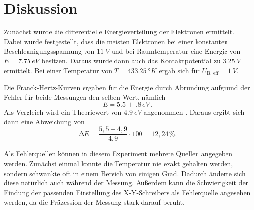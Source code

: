 \section{Diskussion}
\label{sec:Diskussion}

Zunächst wurde die differentielle Energieverteilung der Elektronen ermittelt.
Dabei wurde festgestellt, dass die meisten Elektronen bei einer konstanten Beschleunigungsspannung von $\qty{11}{V}$ und bei Raumtemperatur eine Energie von $E = \qty{7.75}{eV}$ besitzen.
Daraus wurde dann auch das Kontaktpotential zu $\qty{3.25}{V}$ ermittelt.
Bei einer Temperatur von $T = \qty{433.25}{°K}$ ergab sich für $U_\text{B, eff} = \qty{1}{V}$.

Die Franck-Hertz-Kurven ergaben für die Energie durch Abrundung aufgrund der Fehler für beide Messungen den selben Wert,
nämlich
\begin{equation}
    E = \qty{5.5(8)}{eV} \, .
\end{equation}
Als Vergleich wird ein Theoriewert von $\qty{4.9}{eV}$ angenommen \cite{Franck_Hertz}.
Daraus ergibt sich dann eine Abweichung von 
\begin{equation}
    \increment E = \frac{5,5 - 4,9}{4,9} \cdot 100 = 12,24 \, \%.
\end{equation}

Als Fehlerquellen können in diesem Experiment mehrere Quellen angegeben werden.
Zunächst einmal konnte die Temperatur nie exakt gehalten werden, sondern schwankte oft in einem Bereich von einigen Grad.
Dadurch änderte sich diese natürlich auch während der Messung.
Außerdem kann die Schwierigkeit der Findung der passenden Einstellung des X-Y-Schreibers als Fehlerquelle angesehen werden, da die Präzession der Messung stark darauf beruht.